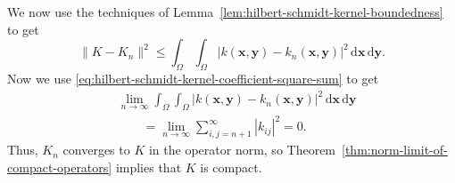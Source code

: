 \begin{Proof}
We now use the techniques of Lemma~\ref{lem:hilbert-schmidt-kernel-boundedness} to get
\begin{equation}\label{eq:hilbert-schmidt-truncation-operator-norm-bound}
\|K-K_n\|^2\leq\int_\Omega\int_\Omega|k(\bm{x},\bm{y})-k_n(\bm{x},\bm{y})|^2\,\mathrm{d}\bm{x}\,\mathrm{d}\bm{y}.
\end{equation}
Now we use \eqref{eq:hilbert-schmidt-kernel-coefficient-square-sum} to get
\begin{equation}\label{eq:hilbert-schmidt-truncation-coefficient-tail}
\begin{aligned}
&\lim_{n\to\infty}\int_\Omega\int_\Omega|k(\bm{x},\bm{y})-k_n(\bm{x},\bm{y})|^2\,\mathrm{d}\bm{x}\,\mathrm{d}\bm{y}\\
&\qquad=\lim_{n\to\infty}\sum_{i,j=n+1}^\infty|k_{ij}|^2=0.
\end{aligned}
\end{equation}
Thus, $K_n$ converges to $K$ in the operator norm, so Theorem~\ref{thm:norm-limit-of-compact-operators} implies that $K$ is compact.
\end{Proof}
\endgroup
